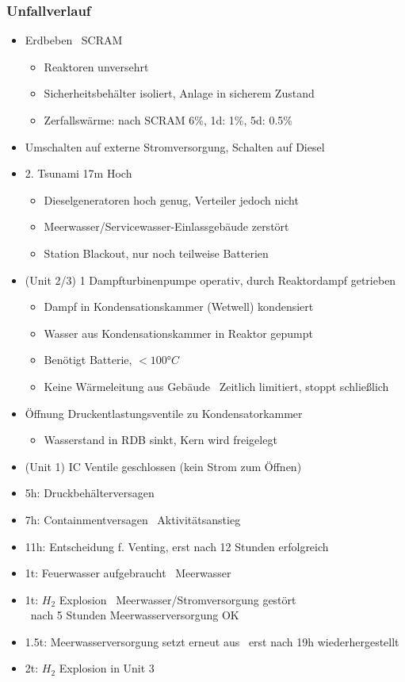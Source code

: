 \documentclass[12pt]{article}
\begin{document}
\subsubsection{Unfallverlauf}
\begin{itemize}[noitemsep]
	\item Erdbeben \textrightarrow\ SCRAM
		\begin{itemize}[noitemsep]
			\item Reaktoren unversehrt
			\item Sicherheitsbehälter isoliert, Anlage in sicherem Zustand
			\item Zerfallswärme: nach SCRAM 6\%, 1d: 1\%, 5d: 0.5\%
		\end{itemize}
	\item Umschalten auf externe Stromversorgung, Schalten auf Diesel
	\item 2. Tsunami 17m Hoch
		\begin{itemize}[noitemsep]
			\item Dieselgeneratoren hoch genug, Verteiler jedoch nicht
			\item Meerwasser/Servicewasser-Einlassgebäude zerstört
			\item Station Blackout, nur noch teilweise Batterien
		\end{itemize}
	\item (Unit 2/3) 1 Dampfturbinenpumpe operativ, durch Reaktordampf getrieben
		\begin{itemize}[noitemsep]
			\item Dampf in Kondensationskammer (Wetwell) kondensiert
			\item Wasser aus Kondensationskammer in Reaktor gepumpt
			\item Benötigt Batterie, \(<100\text{°}C\)
			\item Keine Wärmeleitung aus Gebäude \textrightarrow\ Zeitlich limitiert, stoppt schließlich
		\end{itemize}
	\item Öffnung Druckentlastungsventile zu Kondensatorkammer
		\begin{itemize}[noitemsep]
			\item Wasserstand in RDB sinkt, Kern wird freigelegt
		\end{itemize}
	\item (Unit 1) IC Ventile geschlossen (kein Strom zum Öffnen)
	\item 5h: Druckbehälterversagen
	\item 7h: Containmentversagen \textrightarrow\ Aktivitätsanstieg
	\item 11h: Entscheidung f. Venting, erst nach 12 Stunden erfolgreich
	\item 1t: Feuerwasser aufgebraucht \textrightarrow\ Meerwasser
	\item 1t: \(H_2\) Explosion \textrightarrow\ Meerwasser/Stromversorgung gestört\\
		\textrightarrow\ nach 5 Stunden Meerwasserversorgung OK
	\item 1.5t: Meerwasserversorgung setzt erneut aus \textrightarrow\ erst nach 19h wiederhergestellt
	\item 2t: \(H_2\) Explosion in Unit 3
\end{itemize}
\end{document}
